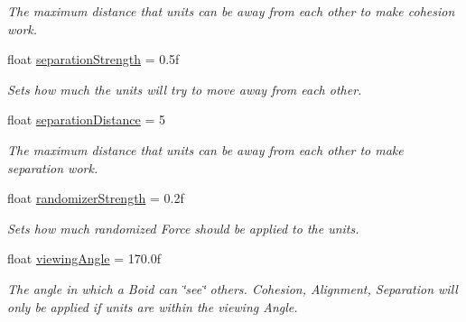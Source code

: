 \begin{DoxyCompactItemize}
\begin{DoxyCompactList}\small\item\em The maximum distance that units can be away from each other to make cohesion work. \end{DoxyCompactList}\item 
\mbox{\label{class_p_s_flocking_1_1_p_s_unit_manager_aa24cb0b36be539ede2aafc43952f4f03}} 
float \hyperlink{class_p_s_flocking_1_1_p_s_unit_manager_aa24cb0b36be539ede2aafc43952f4f03}{separation\+Strength} = 0.\+5f
\begin{DoxyCompactList}\small\item\em Sets how much the units will try to move away from each other. \end{DoxyCompactList}\item 
\mbox{\label{class_p_s_flocking_1_1_p_s_unit_manager_a8d462943657ab150dc43d8007e8d52d0}} 
float \hyperlink{class_p_s_flocking_1_1_p_s_unit_manager_a8d462943657ab150dc43d8007e8d52d0}{separation\+Distance} = 5
\begin{DoxyCompactList}\small\item\em The maximum distance that units can be away from each other to make separation work. \end{DoxyCompactList}\item 
\mbox{\label{class_p_s_flocking_1_1_p_s_unit_manager_a7d2b62844ac4629ec9d6d90327741768}} 
float \hyperlink{class_p_s_flocking_1_1_p_s_unit_manager_a7d2b62844ac4629ec9d6d90327741768}{randomizer\+Strength} = 0.\+2f
\begin{DoxyCompactList}\small\item\em Sets how much randomized Force should be applied to the units. \end{DoxyCompactList}\item 
\mbox{\label{class_p_s_flocking_1_1_p_s_unit_manager_a8b2bb3c41213b2298582fa2f195e394a}} 
float \hyperlink{class_p_s_flocking_1_1_p_s_unit_manager_a8b2bb3c41213b2298582fa2f195e394a}{viewing\+Angle} = 170.\+0f
\begin{DoxyCompactList}\small\item\em The angle in which a Boid can \char`\"{}see\char`\"{} others. Cohesion, Alignment, Separation will only be applied if units are within the viewing Angle. \end{DoxyCompactList}\end{DoxyCompactItemize}
